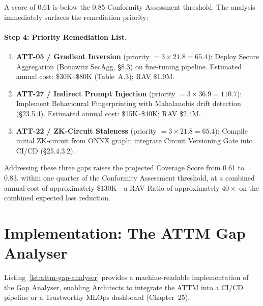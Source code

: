 A score of 0.61 is below the 0.85 Conformity Assessment threshold.
The analysis immediately surfaces the remediation priority:

\paragraph{Step 4: Priority Remediation List.}

\begin{enumerate}
  \item \textbf{ATT-05 / Gradient Inversion} (priority $= 3 \times
        21.8 = 65.4$): Deploy Secure Aggregation (Bonawitz SecAgg,
        §8.3) on fine-tuning pipeline.  Estimated annual cost:
        \$30K--\$80K (Table~A.3); RAV \$1.9M.
  \item \textbf{ATT-27 / Indirect Prompt Injection} (priority $= 3
        \times 36.9 = 110.7$): Implement Behavioural Fingerprinting
        with Mahalanobis drift detection (§23.5.4).  Estimated annual
        cost: \$15K--\$40K; RAV \$2.4M.
  \item \textbf{ATT-22 / ZK-Circuit Staleness} (priority $= 3 \times
        21.8 = 65.4$): Compile initial ZK-circuit from ONNX graph;
        integrate Circuit Versioning Gate into CI/CD (§25.4.3.2).
\end{enumerate}

Addressing these three gaps raises the projected Coverage Score from
0.61 to 0.83, within one quarter of the Conformity Assessment
threshold, at a combined annual cost of approximately \$130K---a RAV
Ratio of approximately $40\times$ on the combined expected loss
reduction.

\section{Implementation: The ATTM Gap Analyser}
\label{sec:attm-implementation}

Listing~\ref{lst:attm-gap-analyser} provides a machine-readable
implementation of the Gap Analyser, enabling Architects to integrate
the ATTM into a CI/CD pipeline or a Trustworthy MLOps dashboard
(Chapter~25).

